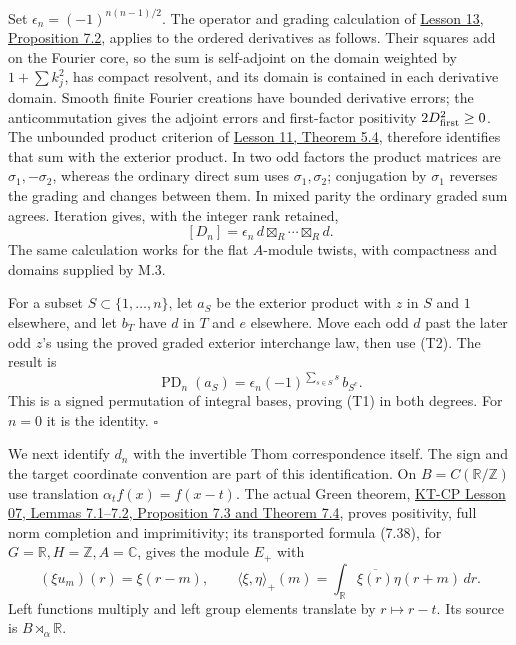 \documentclass[
  11pt,
]{article}
\begin{document}
Set \(\epsilon_n=(-1)^{n(n-1)/2}\). The operator and grading calculation
of \href{KT-KK-13.html\#7-pullback-and-direct-sums}{Lesson 13,
Proposition 7.2}, applies to the ordered derivatives as follows. Their
squares add on the Fourier core, so the sum is self-adjoint on the
domain weighted by \(1+\sum k_j^2\), has compact resolvent, and its
domain is contained in each derivative domain. Smooth finite Fourier
creations have bounded derivative errors; the anticommutation gives the
adjoint errors and first-factor positivity \(2D_{\rm first}^2\geq0\).
The unbounded product criterion of
\href{KT-KK-11.html\#5-recognizing-unbounded-products}{Lesson 11,
Theorem 5.4}, therefore identifies that sum with the exterior product.
In two odd factors the product matrices are \(\sigma_1,-\sigma_2\),
whereas the ordinary direct sum uses \(\sigma_1,\sigma_2\); conjugation
by \(\sigma_1\) reverses the grading and changes between them. In mixed
parity the ordinary graded sum agrees. Iteration gives, with the integer
rank retained, \[
 [D_n]=\epsilon_n\,d\boxtimes_R\cdots\boxtimes_R d.
 \tag{T3}
\] The same calculation works for the flat \(A\)-module twists, with
compactness and domains supplied by M.3.

For a subset \(S\subset\{1,\ldots,n\}\), let \(a_S\) be the exterior
product with \(z\) in \(S\) and \(1\) elsewhere, and let \(b_T\) have
\(d\) in \(T\) and \(e\) elsewhere. Move each odd \(d\) past the later
odd \(z\)'s using the proved graded exterior interchange law, then use
(T2). The result is \[
 \operatorname{PD}_n(a_S)
       =\epsilon_n(-1)^{\sum_{s\in S}s}\,b_{S^c}.
 \tag{T4}
\] This is a signed permutation of integral bases, proving (T1) in both
degrees. For \(n=0\) it is the identity. \(\square\)

We next identify \(d_n\) with the invertible Thom correspondence itself.
The sign and the target coordinate convention are part of this
identification. On \(B=C(\mathbb R/\mathbb Z)\) use translation
\(\alpha_t f(x)=f(x-t)\). The actual Green theorem,
\href{../KT-CP/KT-CP-07.html\#completion-in-the-full-crossed-product-norms}{KT-CP
Lesson 07, Lemmas 7.1--7.2, Proposition 7.3 and Theorem 7.4}, proves
positivity, full norm completion and imprimitivity; its transported
formula (7.38), for \(G=\mathbb R,H=\mathbb Z,A=\mathbb C\), gives the
module \(E_+\) with \[
 (\xi u_m)(r)=\xi(r-m),\qquad
 \langle\xi,\eta\rangle_+(m)=
       \int_{\mathbb R}\overline{\xi(r)}\eta(r+m)\,dr.
 \tag{T5}
\] Left functions multiply and left group elements translate by
\(r\mapsto r-t\). Its source is \(B\rtimes_\alpha\mathbb R\).
\end{document}
